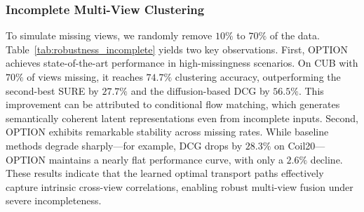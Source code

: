 \documentclass{article}
\theoremstyle{plain}
\theoremstyle{definition}
\theoremstyle{remark}
\begin{document}
\subsubsection{Incomplete Multi-View Clustering}
To simulate missing views, we randomly remove $10\%$ to $70\%$ of the data. Table~\ref{tab:robustness_incomplete} yields two key observations. First, OPTION achieves state-of-the-art performance in high-missingness scenarios. On CUB with $70\%$ of views missing, it reaches $74.7\%$ clustering accuracy, outperforming the second-best SURE by $27.7\%$ and the diffusion-based DCG by $56.5\%$. This improvement can be attributed to conditional flow matching, which generates semantically coherent latent representations even from incomplete inputs. Second, OPTION exhibits remarkable stability across missing rates. While baseline methods degrade sharply—for example, DCG drops by $28.3\%$ on Coil20—OPTION maintains a nearly flat performance curve, with only a $2.6\%$ decline. These results indicate that the learned optimal transport paths effectively capture intrinsic cross-view correlations, enabling robust multi-view fusion under severe incompleteness.
\end{document}
